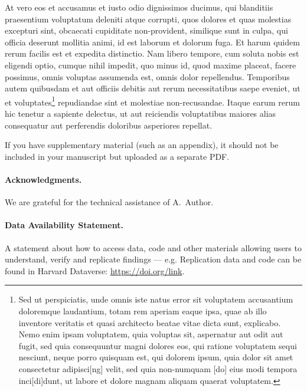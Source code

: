 \documentclass{class}
\begin{document}
At vero eos et accusamus et iusto odio dignissimos ducimus, qui blanditiis praesentium voluptatum deleniti atque corrupti, quos dolores et quas molestias excepturi sint, obcaecati cupiditate non-provident, similique sunt in culpa, qui officia deserunt mollitia animi, id est laborum et dolorum fuga. Et harum quidem rerum facilis est et expedita distinctio. Nam libero tempore, cum soluta nobis est eligendi optio, cumque nihil impedit, quo minus id, quod maxime placeat, facere possimus, omnis voluptas assumenda est, omnis dolor repellendus. Temporibus autem quibusdam et aut officiis debitis aut rerum necessitatibus saepe eveniet, ut et voluptates\footnote{Sed ut perspiciatis, unde omnis iste natus error sit voluptatem accusantium doloremque laudantium, totam rem aperiam eaque ipsa, quae ab illo inventore veritatis et quasi architecto beatae vitae dicta sunt, explicabo. Nemo enim ipsam voluptatem, quia voluptas sit, aspernatur aut odit aut fugit, sed quia consequuntur magni dolores eos, qui ratione voluptatem sequi nesciunt, neque porro quisquam est, qui dolorem ipsum, quia dolor sit amet consectetur adipisci[ng] velit, sed quia non-numquam [do] eius modi tempora inci[di]dunt, ut labore et dolore magnam aliquam quaerat voluptatem.} repudiandae sint et molestiae non-recusandae. Itaque earum rerum hic tenetur a sapiente delectus, ut aut reiciendis voluptatibus maiores alias consequatur aut perferendis doloribus asperiores repellat.

\blinddocument

\bigskip
If you have supplementary material (such as an appendix), it should not be included in your manuscript but uploaded as a separate PDF.

\paragraph*{Acknowledgments.} We are grateful for the technical assistance of A.~Author.

\paragraph*{Data Availability Statement.} A statement about how to access data, code and other materials allowing users to understand, verify and replicate findings — e.g. Replication data and code can be found in Harvard Dataverse: \url{https://doi.org/link}.



\printbibliography
\end{document}
